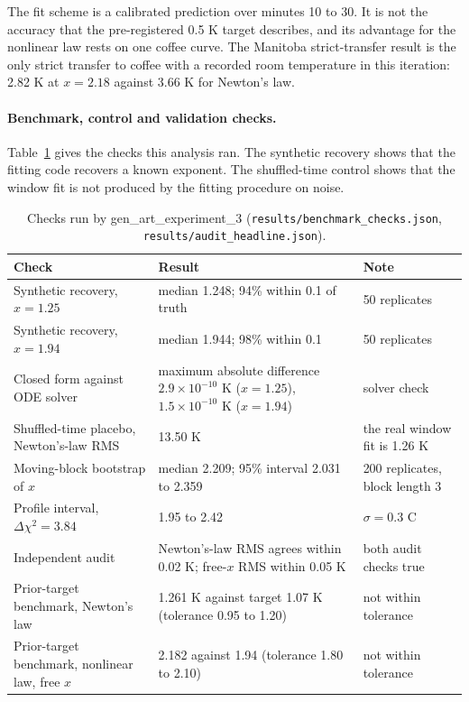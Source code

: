 \documentclass[11pt,letterpaper]{article}
\begin{document}
The fit scheme is a calibrated prediction over minutes 10 to 30. It is not the accuracy that the pre-registered 0.5 K target describes, and its advantage for the nonlinear law rests on one coffee curve. The Manitoba strict-transfer result is the only strict transfer to coffee with a recorded room temperature in this iteration: 2.82 K at $x = 2.18$ against 3.66 K for Newton's law.

\paragraph{Benchmark, control and validation checks.} Table~\ref{tab:it2-checks} gives the checks this analysis ran. The synthetic recovery shows that the fitting code recovers a known exponent. The shuffled-time control shows that the window fit is not produced by the fitting procedure on noise.

\begin{table}[!htbp]
\centering
\small
\caption{Checks run by gen\_art\_experiment\_3 (\texttt{results/benchmark\_checks.json}, \texttt{results/audit\_headline.json}).}
\label{tab:it2-checks}
\begin{tabularx}{\linewidth}{p{4.6cm}p{4.2cm}X}
\toprule
Check & Result & Note \\
\midrule
Synthetic recovery, $x = 1.25$ & median 1.248; 94\% within 0.1 of truth & 50 replicates \\
Synthetic recovery, $x = 1.94$ & median 1.944; 98\% within 0.1 & 50 replicates \\
Closed form against ODE solver & maximum absolute difference $2.9\times10^{-10}$ K ($x = 1.25$), $1.5\times10^{-10}$ K ($x = 1.94$) & solver check \\
Shuffled-time placebo, Newton's-law RMS & 13.50 K & the real window fit is 1.26 K \\
Moving-block bootstrap of $x$ & median 2.209; 95\% interval 2.031 to 2.359 & 200 replicates, block length 3 \\
Profile interval, $\Delta\chi^2 = 3.84$ & 1.95 to 2.42 & $\sigma = 0.3$ C \\
Independent audit & Newton's-law RMS agrees within 0.02 K; free-$x$ RMS within 0.05 K & both audit checks true \\
Prior-target benchmark, Newton's law & 1.261 K against target 1.07 K (tolerance 0.95 to 1.20) & not within tolerance \\
Prior-target benchmark, nonlinear law, free $x$ & 2.182 against 1.94 (tolerance 1.80 to 2.10) & not within tolerance \\
\bottomrule
\end{tabularx}
\end{table}
\end{document}
